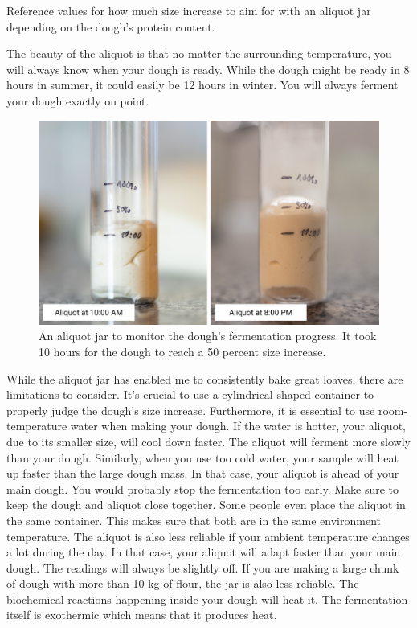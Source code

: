 \begin{table}[!htb]
    \begin{center}
        
        \caption{Reference values for how much size increase to aim for with
        an aliquot jar depending on the dough's protein content.}
    \end{center}
\end{table}

The beauty of the aliquot is that no matter the surrounding
temperature, you will always know when your dough is ready.
While the dough might be ready in 8 hours in summer, it could
easily be 12 hours in winter. You will always ferment your
dough exactly on point.


\begin{figure}[!htb]
  \includegraphics[width=\textwidth]{aliquot-before-after}
  \caption{An aliquot jar to monitor the dough's fermentation progress.
  It took 10 hours for the dough to reach a 50 percent size increase.}
\end{figure}

While the aliquot jar has enabled me to consistently bake
great loaves, there are limitations to consider. It's crucial
to use a cylindrical-shaped container to properly judge
the dough's size increase. Furthermore, it is essential
to use room-temperature water when making your dough. If the
water is hotter, your aliquot, due to its smaller size,
will cool down faster. The aliquot will ferment more slowly
than your dough. Similarly, when you use too cold water,
your sample will heat up faster than the large dough mass.
In that case, your aliquot is ahead of your main dough. You
would probably stop the fermentation too early. Make sure
to keep the dough and aliquot close together. Some people even
place the aliquot in the same container. This makes sure that
both are in the same environment temperature. The aliquot
is also less reliable if your ambient temperature changes
a lot during the day. In that case, your aliquot will adapt
faster than your main dough. The readings will always be slightly
off. If you are making a large chunk of dough with more
than 10 kg of flour, the jar is also less reliable. The biochemical
reactions happening inside your dough will heat it.
The fermentation itself is exothermic which means
that it produces heat.


